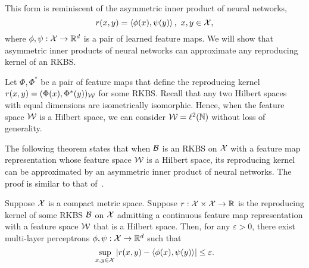 This form is reminiscent of the asymmetric inner product of neural networks,
\begin{equation}
    r(x, y) = \iprod{\phi(x)}{\psi(y)}, \ x, y \in \calX,
\end{equation}
where $\phi, \psi: {\mathcal{X}} \to \mathbb{R}^{d}$ is a pair of learned feature maps. We will show that asymmetric inner products of neural networks can approximate any reproducing kernel of an RKBS.

Let $\Phi, \Phi^*$ be a pair of feature maps that define the reproducing kernel $r(x,y) = (\Phi(x), \Phi^*(y))_{\mathcal{W}}$ for some RKBS. Recall that any two Hilbert spaces with equal dimensions are isometrically isomorphic. Hence, when the feature space ${\mathcal{W}}$ is a Hilbert space, we can consider ${\mathcal{W}} = \ell^2(\mathbb{N})$ without loss of generality. %

The following theorem states that when ${\mathcal{B}}$ is an RKBS on ${\mathcal{X}}$ with a feature map representation whose feature space ${\mathcal{W}}$ is a Hilbert space, its reproducing kernel can be approximated by an asymmetric inner product of neural networks. The proof is similar to that of~.

\begin{theorem}\label{thm:asymmetric_inner_prod_approximates_rkbs}
   Suppose ${\mathcal{X}}$ is a compact metric space. Suppose $r: {\mathcal{X}} \times {\mathcal{X}} \to \mathbb{R}$ is the reproducing kernel of some RKBS ${\mathcal{B}}$ on ${\mathcal{X}}$ admitting a continuous feature map representation with a feature space ${\mathcal{W}}$ that is a Hilbert space. 
   Then, for any $\varepsilon > 0$, there exist multi-layer perceptrons 
    $\phi, \psi: {\mathcal{X}} \to \mathbb{R}^{d}$ such that 
   \begin{equation*}
        \sup_{x,y \in \calX} \abs{r(x, y) - \iprod{\phi(x)}{\psi(y)}} \leq \varepsilon.
   \end{equation*}
\end{theorem}

